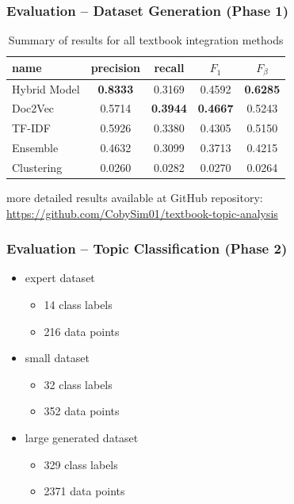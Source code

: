 \documentclass[aspectratio=169]{beamer}
\begin{document}
\begin{frame} \frametitle{Evaluation – Dataset Generation (Phase 1)}


\begin{table}[h]
\centering
\caption{Summary of results for all textbook integration methods}
\label{table:phase1-results}
\begin{tabular}{lcccc}
\toprule
name & precision & recall & $F_1$ & $F_\beta$ \\
\midrule
Hybrid Model & \textbf{0.8333} & 0.3169 & 0.4592 & \textbf{0.6285} \\
Doc2Vec & 0.5714 & \textbf{0.3944} & \textbf{0.4667} & 0.5243 \\
TF-IDF & 0.5926 & 0.3380 & 0.4305 & 0.5150 \\
Ensemble & 0.4632 & 0.3099 & 0.3713 & 0.4215 \\
Clustering & 0.0260 & 0.0282 & 0.0270 & 0.0264 \\
\bottomrule
\end{tabular}
\end{table}

\begin{center}
\scriptsize
more detailed results available at GitHub repository: \\
\url{https://github.com/CobySim01/textbook-topic-analysis}
\end{center}

\end{frame}


\begin{frame} \frametitle{Evaluation – Topic Classification (Phase 2)}
\begin{itemize}
    \item expert dataset
    \begin{itemize}\itemsep0em
        \item 14 class labels
        \item 216 data points
    \end{itemize}
    \item small dataset
    \begin{itemize}\itemsep0em
        \item 32 class labels
        \item 352 data points
    \end{itemize}
    \item large generated dataset
    \begin{itemize}\itemsep0em
        \item 329 class labels
        \item 2371 data points
    \end{itemize}
\end{itemize}
\end{frame}
\end{document}
